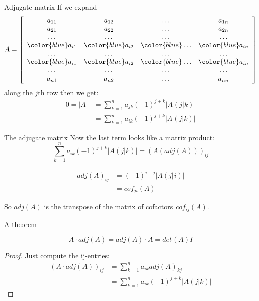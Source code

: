 \documentclass{beamer}
\begin{document}
\begin{frame}{Adjugate matrix}
  If we expand
  \begin{equation*}
    A = \left[
      \begin{array}{cccc}
        a_{11} & a_{12} & \dots & a_{1n}\\
        a_{21} & a_{22} & \dots & a_{2n}\\
        \dots & \dots & \dots & \dots\\
        {\color{blue}a_{i1}} & {\color{blue}a_{i2}} & {\color{blue}\dots} & {\color{blue}a_{in}}\\
        \dots & \dots & \dots & \dots\\
        {\color{blue}a_{i1}} & {\color{blue}a_{i2}} & {\color{blue}\dots}& {\color{blue}a_{in}}\\
        \dots & \dots & \dots & \dots\\
        a_{n1} & a_{n2} & \dots & a_{nn}\\
      \end{array}
    \right]
  \end{equation*}
  along the $j$th row then we get:
  \begin{align*}
    0 = \left|A\right| &= \sum_{k=1}^n a_{jk}(-1)^{j+k}\left|A(j|k)\right|\\
                   &= \sum_{k=1}^n a_{ik}(-1)^{j+k}\left|A(j|k)\right|
  \end{align*}
\end{frame}

\begin{frame}{The adjugate matrix}
  Now the last term looks like a matrix product:
  \begin{equation*}
    \sum_{k=1}^n a_{ik}(-1)^{j+k}\left|A(j|k)\right| = (A(adj (A)))_{ij}
  \end{equation*}
  \begin{definition}
    \begin{align*}
      adj (A)_{ij} &= (-1)^{i+j}\left|A(j|i)\right|\\
                   &= cof_{ji}(A)
    \end{align*}
  \end{definition}
  So $adj(A)$ is the transpose of the matrix of cofactors $cof_{ij}(A)$.
\end{frame}

\begin{frame}{A theorem}
  \begin{theorem}
    \begin{equation*}
      A\cdot adj(A) = adj(A)\cdot A = det(A) I
    \end{equation*}
    \begin{proof}
      Just compute the ij-entries:
      \begin{align*}
        (A\cdot adj(A))_{ij} &= \sum_{k=1}^n a_{ik}adj(A)_{kj}\\
                             &= \sum_{k=1}^n a_{ik}(-1)^{j+k}\left|A(j|k)\right|
      \end{align*}
    \end{proof}
  \end{theorem}
\end{frame}
\end{document}
